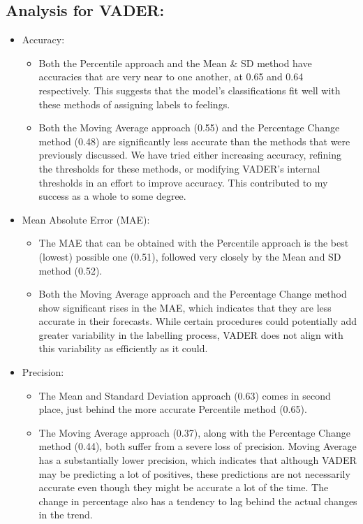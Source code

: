 \documentclass[12pt, a4paper,twoside]{report}
\theoremstyle{plain} %
\theoremstyle{definition} %
\theoremstyle{remark} %
\numberwithin{equation}{chapter}
\begin{document}
    \subsection{\textbf{Analysis for VADER:}}
    \begin{itemize}
        \item Accuracy:
            \begin{itemize}
                \item Both the Percentile approach and the Mean \& SD method have accuracies that are very near to one another, at 0.65 and 0.64 respectively. This suggests that the model's classifications fit well with these methods of assigning labels to feelings.
                \item Both the Moving Average approach (0.55) and the Percentage Change method (0.48) are significantly less accurate than the methods that were previously discussed. We have tried either increasing accuracy, refining the thresholds for these methods, or modifying VADER's internal thresholds in an effort to improve accuracy. This contributed to my success as a whole to some degree.
            \end{itemize}
        \item Mean Absolute Error (MAE):
            \begin{itemize}
               \item  The MAE that can be obtained with the Percentile approach is the best (lowest)    possible one (0.51), followed very closely by the Mean and SD method (0.52).
                \item Both the Moving Average approach and the Percentage Change method show significant rises in the MAE, which indicates that they are less accurate in their forecasts. While certain procedures could potentially add greater variability in the labelling process, VADER does not align with this variability as efficiently as it could. 
            \end{itemize}
        \item Precision:
            \begin{itemize}
                \item The Mean and Standard Deviation approach (0.63) comes in second place, just behind the more accurate Percentile method (0.65).
                \item The Moving Average approach (0.37), along with the Percentage Change method (0.44), both suffer from a severe loss of precision. Moving Average has a substantially lower precision, which indicates that although VADER may be predicting a lot of positives, these predictions are not necessarily accurate even though they might be accurate a lot of the time. The change in percentage also has a tendency to lag behind the actual changes in the trend.

\end{itemize}
\end{itemize}
\end{document}
